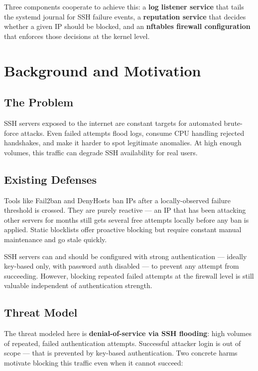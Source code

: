 \documentclass[11pt, letterpaper]{article}
\begin{document}
Three components cooperate to achieve this: a \textbf{log listener service} that tails the systemd journal for SSH failure events, a \textbf{reputation service} that decides whether a given IP should be blocked, and an \textbf{nftables firewall configuration} that enforces those decisions at the kernel level.

\section{Background and Motivation}

\subsection{The Problem}

SSH servers exposed to the internet are constant targets for automated brute-force attacks. Even failed attempts flood logs, consume CPU handling rejected handshakes, and make it harder to spot legitimate anomalies. At high enough volumes, this traffic can degrade SSH availability for real users.

\subsection{Existing Defenses}

Tools like Fail2ban and DenyHosts ban IPs after a locally-observed failure threshold is crossed. They are purely reactive --- an IP that has been attacking other servers for months still gets several free attempts locally before any ban is applied. Static blocklists offer proactive blocking but require constant manual maintenance and go stale quickly.

SSH servers can and should be configured with strong authentication --- ideally key-based only, with password auth disabled --- to prevent any attempt from succeeding. However, blocking repeated failed attempts at the firewall level is still valuable independent of authentication strength.

\subsection{Threat Model}

The threat modeled here is \textbf{denial-of-service via SSH flooding}: high volumes of repeated, failed authentication attempts. Successful attacker login is out of scope --- that is prevented by key-based authentication. Two concrete harms motivate blocking this traffic even when it cannot succeed:
\end{document}
